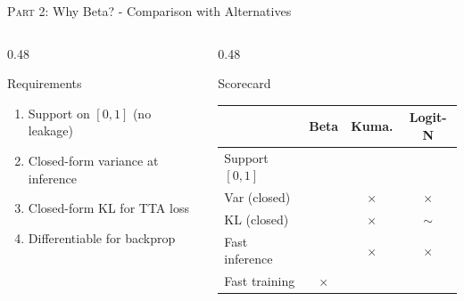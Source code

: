 \documentclass[aspectratio=169]{beamer}
\begin{document}
	\begin{frame}{\textsc{Part 2:} Why Beta? - Comparison with Alternatives}
		\begin{columns}[onlytextwidth]
			\begin{column}{0.48\textwidth}
				\begin{block}{Requirements}
					\small
					\begin{enumerate}
						\item Support on $[0,1]$ (no leakage)
						\item Closed-form variance at inference
						\item Closed-form KL for TTA loss
						\item Differentiable for backprop
					\end{enumerate}
				\end{block}
			\end{column}
			\begin{column}{0.48\textwidth}
				\begin{block}{Scorecard}
					\footnotesize
					\begin{tabular}{lccc}
						& Beta & Kuma. & Logit-N \\
						\hline
						Support $[0,1]$ & \checkmark & \checkmark & \checkmark \\
						Var (closed) & \checkmark & $\times$ & $\times$ \\
						KL (closed) & \checkmark & $\times$ & $\sim$ \\
						Fast inference & \checkmark & $\times$ & $\times$ \\
						Fast training & $\times$ & \checkmark & \checkmark \\
					\end{tabular}
				\end{block}
			\end{column}
		\end{columns}
	\end{frame}
\end{document}
